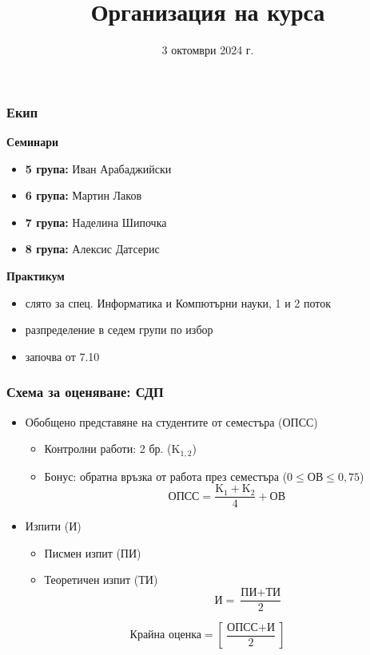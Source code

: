 \documentclass[alsotrans,beameroptions={aspectratio=169}]{beamerswitch}
\title{Организация на курса}
\date{3 октомври 2024 г.}
\begin{document}
\begin{frame}
  \titlepage
\end{frame}

\begin{frame}
  \frametitle{Екип}

  \textbf{Семинари}
  \begin{itemize}
  \item \textbf{5 група:} Иван Арабаджийски
  \item \textbf{6 група:} Мартин Лаков
  \item \textbf{7 група:} Наделина Шипочка
  \item \textbf{8 група:} Алексис Датсерис
  \end{itemize}
  \vspace{1ex}
  \textbf{Практикум}
  \begin{itemize}
  \item слято за спец. Информатика и Компютърни науки, 1 и 2 поток
  \item разпределение в седем групи по избор
  \item започва от 7.10
  \end{itemize}
\end{frame}

\begin{frame}
  \frametitle{Схема за оценяване: СДП}

  \begin{itemize}
  \item Обобщено представяне на студентите от семестъра (ОПСС)
    \begin{itemize}
    \item Контролни работи: 2 бр. (K$_{1,2}$)
    \item Бонус: обратна връзка от работа през семестъра ($0 \leq \text{ОВ} \leq 0{,}75$)\\
      \begin{equation*}
        \text{ОПСС} = \frac{\text{K}_1 + \text{K}_2}4 + \text{ОВ}
      \end{equation*}
    \end{itemize}
  \item Изпити (И)
    \begin{itemize}
    \item Писмен изпит (ПИ)
    \item Теоретичен изпит (ТИ)\\[-7.5ex]
      \begin{equation*}
        \qquad\qquad\text{И} = \frac{\text{ПИ} + \text{ТИ}}2
      \end{equation*}
    \end{itemize}
  \end{itemize}
  \vspace{2ex}
  \begin{equation*}
    \text{Крайна оценка} = \left[ \frac{\text{ОПСС} + \text{И}}2 \right]
  \end{equation*}
\end{frame}
\end{document}
